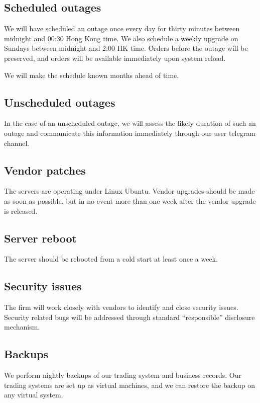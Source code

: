 \subsection{Scheduled outages}
We will have scheduled an outage once every day for thirty minutes
between midnight and 00:30 Hong Kong time.  We also schedule a weekly
upgrade on Sundays between midnight and 2:00 HK time.  Orders before
the outage will be preserved, and orders will be available immediately
upon system reload.

We will make the schedule known months ahead of time.

\subsection{Unscheduled outages}
In the case of an unscheduled outage, we will assess the likely duration of
such an outage and communicate this information immediately through
our user telegram channel.


\subsection{Vendor patches}
The servers are operating under Linux Ubuntu.  Vendor upgrades should
be made as soon as possible, but in no event more than one week after
the vendor upgrade is released.

\subsection{Server reboot}
The server should be rebooted from a cold start at least once a week.

\subsection{Security issues}
The firm will work closely with vendors to identify and close security
issues.  Security related bugs will be addressed through standard
``responsible'' disclosure mechanism.

\subsection{Backups}
We perform nightly backups of our trading system and business
records.  Our trading systems are set up as virtual machines, and we can
restore the backup on any virtual system.




